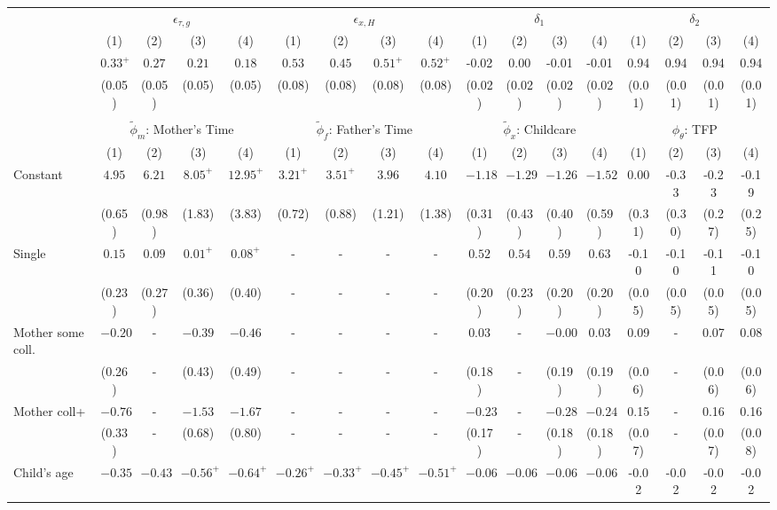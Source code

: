 \begin{tabular}{lcccccccccccccccc}\\\toprule
 & \multicolumn{4}{c}{$\epsilon_{\tau,g}$} & \multicolumn{4}{c}{$\epsilon_{x,H}$} & \multicolumn{4}{c}{$\delta_{1}$} & \multicolumn{4}{c}{$\delta_{2}$} \\
&(1)&(2)&(3)&(4)&(1)&(2)&(3)&(4)&(1)&(2)&(3)&(4)&(1)&(2)&(3)&(4)\\\cmidrule(r){2-5}\cmidrule(r){6-9}\cmidrule(r){10-13}\cmidrule(r){14-17}
&$0.33^{+}$&$0.27$&$0.21$&$0.18$&$0.53$&$0.45$&$0.51^{+}$&$0.52^{+}$&-0.02&0.00&-0.01&-0.01&0.94&0.94&0.94&0.94\\
&(0.05)&(0.05)&(0.05)&(0.05)&(0.08)&(0.08)&(0.08)&(0.08)&(0.02)&(0.02)&(0.02)&(0.02)&(0.01)&(0.01)&(0.01)&(0.01)\\
&&&&&&&&&&&&&&&&\\
 & \multicolumn{4}{c}{$\tilde{\phi}_{m}$: Mother's Time} & \multicolumn{4}{c}{$\tilde{\phi}_{f}$: Father's Time} & \multicolumn{4}{c}{$\tilde{\phi}_{x}$: Childcare} & \multicolumn{4}{c}{$\phi_{\theta}$: TFP} \\
&(1)&(2)&(3)&(4)&(1)&(2)&(3)&(4)&(1)&(2)&(3)&(4)&(1)&(2)&(3)&(4)\\\cmidrule(r){2-5}\cmidrule(r){6-9}\cmidrule(r){10-13}\cmidrule(r){14-17}
Constant&$4.95$&$6.21$&$8.05^{+}$&$12.95^{+}$&$3.21^{+}$&$3.51^{+}$&$3.96$&$4.10$&$-1.18$&$-1.29$&$-1.26$&$-1.52$&0.00&-0.33&-0.23&-0.19\\
&(0.65)&(0.98)&(1.83)&(3.83)&(0.72)&(0.88)&(1.21)&(1.38)&(0.31)&(0.43)&(0.40)&(0.59)&(0.31)&(0.30)&(0.27)&(0.25)\\
Single&$0.15$&$0.09$&$0.01^{+}$&$0.08^{+}$&-&-&-&-&$0.52$&$0.54$&$0.59$&$0.63$&-0.10&-0.10&-0.11&-0.10\\
&(0.23)&(0.27)&(0.36)&(0.40)&-&-&-&-&(0.20)&(0.23)&(0.20)&(0.20)&(0.05)&(0.05)&(0.05)&(0.05)\\
Mother some coll.&$-0.20$&-&$-0.39$&$-0.46$&-&-&-&-&$0.03$&-&$-0.00$&$0.03$&0.09&-&0.07&0.08\\
&(0.26)&-&(0.43)&(0.49)&-&-&-&-&(0.18)&-&(0.19)&(0.19)&(0.06)&-&(0.06)&(0.06)\\
Mother coll+&$-0.76$&-&$-1.53$&$-1.67$&-&-&-&-&$-0.23$&-&$-0.28$&$-0.24$&0.15&-&0.16&0.16\\
&(0.33)&-&(0.68)&(0.80)&-&-&-&-&(0.17)&-&(0.18)&(0.18)&(0.07)&-&(0.07)&(0.08)\\
Child's age&$-0.35$&$-0.43$&$-0.56^{+}$&$-0.64^{+}$&$-0.26^{+}$&$-0.33^{+}$&$-0.45^{+}$&$-0.51^{+}$&$-0.06$&$-0.06$&$-0.06$&$-0.06$&-0.02&-0.02&-0.02&-0.02\\

\end{tabular}
